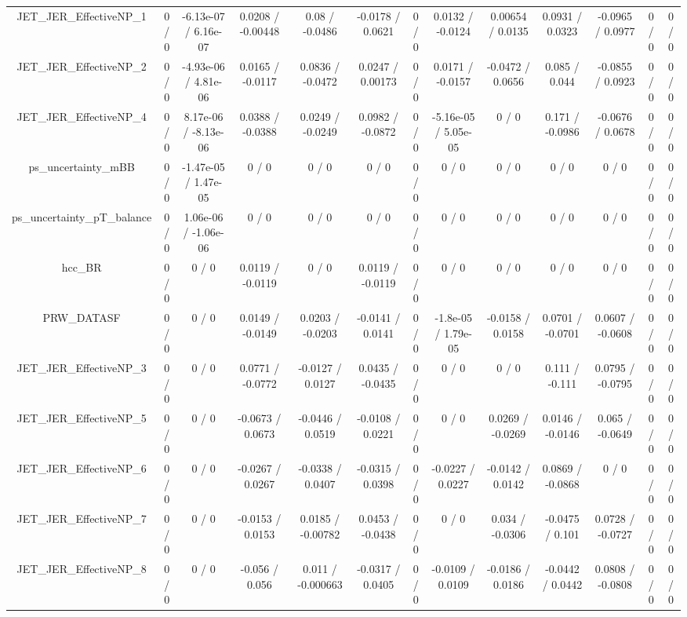\documentclass[10pt]{article}
\begin{document}
\begin{table}[htbp]
\begin{center}
\begin{tabular}{|c|c|c|c|c|c|c|c|c|c|c|c|c|}
  JET_JER_EffectiveNP_1 & 0 / 0 & -6.13e-07 / 6.16e-07 & 0.0208 / -0.00448 & 0.08 / -0.0486 & -0.0178 / 0.0621 & 0 / 0 & 0.0132 / -0.0124 & 0.00654 / 0.0135 & 0.0931 / 0.0323 & -0.0965 / 0.0977 & 0 / 0 & 0 / 0 \\ 
  JET_JER_EffectiveNP_2 & 0 / 0 & -4.93e-06 / 4.81e-06 & 0.0165 / -0.0117 & 0.0836 / -0.0472 & 0.0247 / 0.00173 & 0 / 0 & 0.0171 / -0.0157 & -0.0472 / 0.0656 & 0.085 / 0.044 & -0.0855 / 0.0923 & 0 / 0 & 0 / 0 \\ 
  JET_JER_EffectiveNP_4 & 0 / 0 & 8.17e-06 / -8.13e-06 & 0.0388 / -0.0388 & 0.0249 / -0.0249 & 0.0982 / -0.0872 & 0 / 0 & -5.16e-05 / 5.05e-05 & 0 / 0 & 0.171 / -0.0986 & -0.0676 / 0.0678 & 0 / 0 & 0 / 0 \\ 
  ps_uncertainty_mBB & 0 / 0 & -1.47e-05 / 1.47e-05 & 0 / 0 & 0 / 0 & 0 / 0 & 0 / 0 & 0 / 0 & 0 / 0 & 0 / 0 & 0 / 0 & 0 / 0 & 0 / 0 \\ 
  ps_uncertainty_pT_balance & 0 / 0 & 1.06e-06 / -1.06e-06 & 0 / 0 & 0 / 0 & 0 / 0 & 0 / 0 & 0 / 0 & 0 / 0 & 0 / 0 & 0 / 0 & 0 / 0 & 0 / 0 \\ 
  hcc_BR & 0 / 0 & 0 / 0 & 0.0119 / -0.0119 & 0 / 0 & 0.0119 / -0.0119 & 0 / 0 & 0 / 0 & 0 / 0 & 0 / 0 & 0 / 0 & 0 / 0 & 0 / 0 \\ 
  PRW_DATASF & 0 / 0 & 0 / 0 & 0.0149 / -0.0149 & 0.0203 / -0.0203 & -0.0141 / 0.0141 & 0 / 0 & -1.8e-05 / 1.79e-05 & -0.0158 / 0.0158 & 0.0701 / -0.0701 & 0.0607 / -0.0608 & 0 / 0 & 0 / 0 \\ 
  JET_JER_EffectiveNP_3 & 0 / 0 & 0 / 0 & 0.0771 / -0.0772 & -0.0127 / 0.0127 & 0.0435 / -0.0435 & 0 / 0 & 0 / 0 & 0 / 0 & 0.111 / -0.111 & 0.0795 / -0.0795 & 0 / 0 & 0 / 0 \\ 
  JET_JER_EffectiveNP_5 & 0 / 0 & 0 / 0 & -0.0673 / 0.0673 & -0.0446 / 0.0519 & -0.0108 / 0.0221 & 0 / 0 & 0 / 0 & 0.0269 / -0.0269 & 0.0146 / -0.0146 & 0.065 / -0.0649 & 0 / 0 & 0 / 0 \\ 
  JET_JER_EffectiveNP_6 & 0 / 0 & 0 / 0 & -0.0267 / 0.0267 & -0.0338 / 0.0407 & -0.0315 / 0.0398 & 0 / 0 & -0.0227 / 0.0227 & -0.0142 / 0.0142 & 0.0869 / -0.0868 & 0 / 0 & 0 / 0 & 0 / 0 \\ 
  JET_JER_EffectiveNP_7 & 0 / 0 & 0 / 0 & -0.0153 / 0.0153 & 0.0185 / -0.00782 & 0.0453 / -0.0438 & 0 / 0 & 0 / 0 & 0.034 / -0.0306 & -0.0475 / 0.101 & 0.0728 / -0.0727 & 0 / 0 & 0 / 0 \\ 
  JET_JER_EffectiveNP_8 & 0 / 0 & 0 / 0 & -0.056 / 0.056 & 0.011 / -0.000663 & -0.0317 / 0.0405 & 0 / 0 & -0.0109 / 0.0109 & -0.0186 / 0.0186 & -0.0442 / 0.0442 & 0.0808 / -0.0808 & 0 / 0 & 0 / 0 \\ 

\end{tabular}
\end{center}
\end{table}
\end{document}

